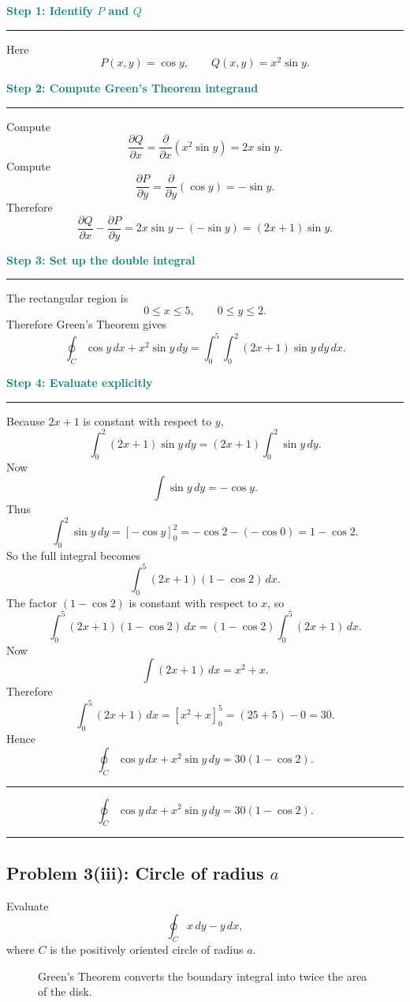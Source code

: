 \documentclass[11pt,a4paper]{article}
\newenvironment{reasonbox}[1]{%
  \par\medskip
  \noindent\textcolor{teal}{\bfseries #1}\par
  \noindent\textcolor{teal}{\rule{0.72\linewidth}{0.45pt}}\par\smallskip
}{\par\medskip}
\newenvironment{answerbox}{%
  \par\medskip
  \noindent\textcolor{orange}{\rule{\linewidth}{0.8pt}}\par
  \begingroup\bfseries
}{%
  \par\endgroup
  \noindent\textcolor{orange}{\rule{\linewidth}{0.8pt}}\par\medskip
}
\newcommand{\pd}[2]{\frac{\partial #1}{\partial #2}}
\begin{document}
\begin{reasonbox}{Step 1: Identify \(P\) and \(Q\)}
Here
\[
P(x,y)=\cos y,
\qquad
Q(x,y)=x^2\sin y.
\]
\end{reasonbox}

\begin{reasonbox}{Step 2: Compute Green's Theorem integrand}
Compute
\[
\pd{Q}{x}=\pd{}{x}(x^2\sin y)=2x\sin y.
\]
Compute
\[
\pd{P}{y}=\pd{}{y}(\cos y)=-\sin y.
\]
Therefore
\[
\pd{Q}{x}-\pd{P}{y}=2x\sin y-(-\sin y)=(2x+1)\sin y.
\]
\end{reasonbox}

\begin{reasonbox}{Step 3: Set up the double integral}
The rectangular region is
\[
0\le x\le5,
\qquad
0\le y\le2.
\]
Therefore Green's Theorem gives
\[
\oint_C \cos y\,dx+x^2\sin y\,dy
=\int_0^5\int_0^2(2x+1)\sin y\,dy\,dx.
\]
\end{reasonbox}

\begin{reasonbox}{Step 4: Evaluate explicitly}
Because \(2x+1\) is constant with respect to \(y\),
\[
\int_0^2(2x+1)\sin y\,dy=(2x+1)\int_0^2\sin y\,dy.
\]
Now
\[
\int \sin y\,dy=-\cos y.
\]
Thus
\[
\int_0^2\sin y\,dy=[-\cos y]_0^2=-\cos2-(-\cos0)=1-\cos2.
\]
So the full integral becomes
\[
\int_0^5(2x+1)(1-\cos2)\,dx.
\]
The factor \((1-\cos2)\) is constant with respect to \(x\), so
\[
\int_0^5(2x+1)(1-\cos2)\,dx=(1-\cos2)\int_0^5(2x+1)\,dx.
\]
Now
\[
\int(2x+1)\,dx=x^2+x.
\]
Therefore
\[
\int_0^5(2x+1)\,dx=[x^2+x]_0^5=(25+5)-0=30.
\]
Hence
\[
\oint_C \cos y\,dx+x^2\sin y\,dy=30(1-\cos2).
\]
\end{reasonbox}

\begin{answerbox}
\[
\boxed{\oint_C \cos y\,dx+x^2\sin y\,dy=30(1-\cos2).}
\]
\end{answerbox}

\newpage
\subsection{Problem 3(iii): Circle of radius \texorpdfstring{\(a\)}{a}}
Evaluate
\[
\oint_C x\,dy-y\,dx,
\]
where \(C\) is the positively oriented circle of radius \(a\).

\begin{figure}[H]
\centering
{}
\caption{Green's Theorem converts the boundary integral into twice the area of the disk.}
\end{figure}
\end{document}
